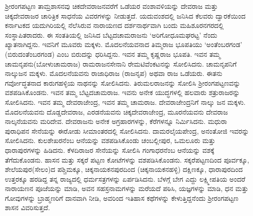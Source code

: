 ಶ‍್ರೀರಂಗಪಟ್ಟಣ ತಾಮ್ರಶಾಸನವು ಚಿಕದೇವರಾಜನವರೆಗೆ ಒಡೆಯರ ವಂಶಾವಳಿಯನ್ನು ದೇವರಾಜ ಮತ್ತು ಚಿಕ್ಕದೇವರಾಜರ ಚಾರಿತ್ರಿಕ ಸಾಧನೆಯ ವಿವರಗಳನ್ನು ನೀಡುತ್ತದೆ. ಯದುವಂಶದಲ್ಲಿ ಜನಿಸಿದ ಕೆಲವರು ದ್ವಾರಕೆಯಿಂದ ಕರ್ನಾಟಕದ ಯದುಗಿರಿಯಲ್ಲಿ ನೆಲೆಸಿರುವ ನಾರಾಯಣದ ದರ್ಶನಾರ್ಥವಾಗಿ ಬಂದು ಮಹಿಶೂರನಗರದಲ್ಲಿ ಸಂಸ್ಥಾಪಿತರಾದರು. ಈ ಸಂತತಿಯಲ್ಲಿ ಜನಿಸಿದ ಬೆಟ್ಟದಚಾಮರಾಜನು ‘ಅರಿಗೋಧೂಮಘರಟ್ಟ’ ನೆಂದು ಖ್ಯಾತನಾಗಿದ್ದನು. ಇವನಿಗೆ ಮೂವರು ಮಕ್ಕಳು. ಮೊದಲನೆಯವನಾದ ತಿಮ್ಮರಾಜ ಭೂಪತಿಯು ‘ಅಂತೆಂಬರಗಂಡ’ (ಬಿರುದಂತೆಂಬರಗಂಡ) ಎಂಬ ಬಿರುದನ್ನು ಧರಿಸಿದ್ದನು. ಇವನ ತಮ್ಮ ಕೃಷ್ಣರಾಜ ಭೂಪತಿ. ಇವನ ತಮ್ಮ ಚಾಮನೃಪನು(ಬೋಳುಚಾಮರಾಜ) ರಾಮರಾಜನಸೇನಾನಿ ರೇಮಟಿವೆಂಕಟನನ್ನು ಸೋಲಿಸಿದನು. ಚಾಮನೃಪನಿಗೆ ನಾಲ್ಕುಜನ ಮಕ್ಕಳು. ಮೊದಲನೆಯವನು ರಾಜಾಧಿರಾಜ (ರಾಜನೃಪ) ಅಥವಾ ರಾಜ ಒಡೆಯರು. ಈತನು ಗರ್ವೋದ್ಧತನಾದ ಕಾರುಗಹಳ್ಳಿಯ ನಾಥನನ್ನು ಸೋಲಿಸಿದನು. ತಿರುಮಲರಾಜನನ್ನು ಸೋಲಿಸಿ ಶ‍್ರೀರಂಗಪಟ್ಟಣವನ್ನು ವಶಪಡಿಸಿಕೊಂಡನು. ಇವನ ತಮ್ಮ ಬೆಟ್ಟದಚಾಮರಾಜ. ಇವನು ಅನೇಕ ಯುದ್ಧಗಳಲ್ಲಿ ಹಲವಾರು ಶತ್ರುರಾಜರನ್ನು ಸೋಲಿಸಿದನು. ಇವನ ತಮ್ಮ ದೇವರಾಜೇಂದ್ರ, ಇವನ ತಮ್ಮ ಚಾಮರಾಜ. ದೇವರಾಜೇಂದ್ರನಿಗೆ ನಾಲ್ಕು ಜನ ಮಕ್ಕಳು. ಮೊದಲನೆಯವನು ದೊಡ್ಡದೇವರಾಜ, ಎರಡನೆಯವನು ಚಿಕ್ಕದೇವರಾಜೇಂದ್ರ, ಮೂರನೆಯವನು ದೇವರಾಜ ನಾಲ್ಕನೆಯವನು ಮರಿದೇವ. ದೇವರಾಜನು ಅನೇಕ ಅಗ್ರಹಾರಗಳನ್ನು, ಕೆರೆಗಳನ್ನೂ ನಿರ್ಮಿಸಿದನು. ಮಧುರಾ ಪುರಾಧಿಪನ ಸೇನೆಯನ್ನು ಈರೋಡು ಸೀಮಾಂತರದಲ್ಲಿ ಸೋಲಿಸಿದನು. ದಾಮರಲೈಯಪೇಂದ್ರ, ಅನಂತೋಜಿ ಇವರನ್ನು ಸೋಲಿಸಿದನು. ಕುಲಶೇಖರನೆಂಬ ಆನೆಯನ್ನು ವಶಪಡಿಸಿಕೊಂಡು ಚಂಬಲ್ಲೀಪುರ, ಒಮಲೂರು ಮತ್ತು ಧಾರಾಪುರಗಳನ್ನು ಹಿಡಿದನು. ಕೆಳದಿರಾಜರ ಸೇನೆಯನ್ನು ಸೋಲಿಸಿ ಗಂಗಾಧರನೆಂಬ ಆನೆಯನ್ನು ವಶಕ್ಕೆ ತೆಗೆದುಕೊಂಡನು. ಹಾಸನ ಮತ್ತು ಸಕ್ಕರೆ ಪಟ್ಟಣ ಕೋಟೆಗಳನ್ನು ವಶಪಡಿಸಿಕೊಂಡನು. ಸಕ್ಕರೆಪಟ್ಟಣದಿಂದ ಪೂರ್ವಕ್ಕೂ, ಶೇಲೆಯಪುರ(ಸೇಲಂ)ದ ಪಶ್ಚಿಮಕ್ಕೂ, ಚಿಕ್ಕನಾಯಕನಪುರದಿಂದ (ಚಿಕ್ಕನಾಯಕನಹಳ್ಳಿ) ದಕ್ಷಿಣಕ್ಕೂ, ಧಾರಾಪುರದಿಂದ ಉತ್ತರಕ್ಕೂ ಹರಡಿದ್ದ ತನ್ನ ರಾಜ್ಯದಲ್ಲಿ ಧರ್ಮಸತ್ರಗಳನ್ನು ಏರ್ಪಡಿಸಿದನು. ಬೆಳಗ್ಗೆ ಬೇಗ ಎದ್ದು ಲಕ್ಷ್ಮೀಪತಿಯ ಅಂದರೆ ನಾರಾಯಣನ ಪೂಜೆಯನ್ನು ಮಾಡಿ, ಅವನ ಸಹಸ್ರನಾಮಗಳನ್ನು ಮರೆಯದೆ ಪಠಿಸಿ, ಯಜ್ಞಗಳನ್ನು ಮಾಡಿ, ಧನ ಮತ್ತು ಗೋವುಗಳನ್ನು ಬ್ರಾಹ್ಮಣರಿಗೆ ದಾನವಾಗಿ ನೀಡಿ, ಅವರಿಂದ ಇತಿಹಾಸ ಕಥೆಗಳನ್ನು ಕೇಳುತ್ತಿದ್ದನೆಂದು ಶ‍್ರೀರಂಗಪಟ್ಟಣ ಶಾಸನ ವಿವರಿಸುತ್ತದೆ. 

